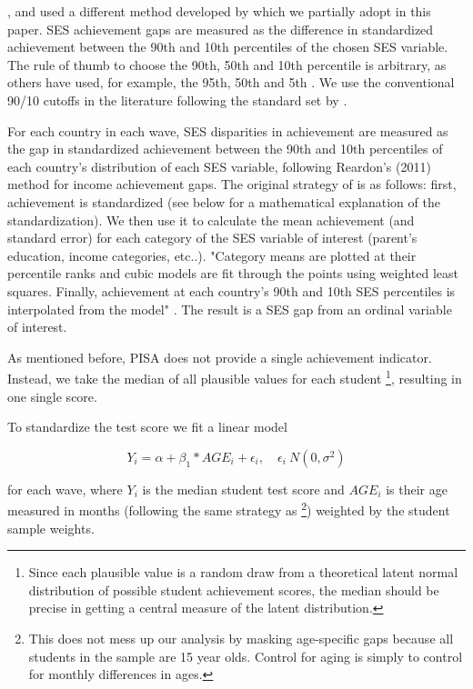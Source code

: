 \documentclass[11pt, a4paper]{article}\usepackage[]{graphicx}\usepackage[]{color}
\begin{document}
\citet{reardon_portilla}, \citet{anna2016} and \citet{anna2016_global} used a different method developed by \citet{reardon2011} which we partially adopt in this paper. SES achievement gaps are measured as the difference in standardized achievement between the 90th and 10th percentiles of the chosen SES variable. The rule of thumb to choose the 90th, 50th and 10th percentile is arbitrary, as others have used, for example, the 95th, 50th and 5th \citep{micklewright}. We use the conventional 90/10 cutoffs in the literature following the standard set by \citet{reardon2011}.

For each country in each wave, SES disparities in achievement are measured as the gap in standardized achievement between the 90th and 10th percentiles of each country’s distribution of each SES variable, following Reardon’s (2011) method for income achievement gaps. The original strategy of \citet{reardon2011} is as follows: first, achievement is standardized (see below for a mathematical explanation of the standardization). We then use it to calculate the mean achievement (and standard error) for each category of the SES variable of interest (parent's education, income categories, etc..). "Category means are plotted at their percentile ranks and cubic models are fit through the points using weighted least squares. Finally, achievement at each country’s 90th and 10th SES percentiles is interpolated from the model" \citep{anna2016_global}. The result is a SES gap from an ordinal variable of interest.

As mentioned before, PISA does not provide a single achievement indicator. Instead, we take the median of all plausible values for each student \footnote{Since each plausible value is a random draw from a theoretical latent normal distribution of possible student achievement scores, the median should be precise in getting a central measure of the latent distribution.}, resulting in one single score.

To standardize the test score we fit a linear model

\begin{equation}
Y_i = \alpha + \beta_1 * AGE_i + \epsilon_i, \quad \epsilon_i ~ N(0, \sigma^2)
\end{equation}

for each wave, where \begin{math}Y_i\end{math} is the median student test score and \begin{math}AGE_i\end{math} is their age measured in months (following the same strategy as \citet{reardon2011} \footnote{This does not mess up our analysis by masking age-specific gaps because all students in the sample are 15 year olds. Control for aging is simply to control for monthly differences in ages.}) weighted by the student sample weights.
\end{document}
